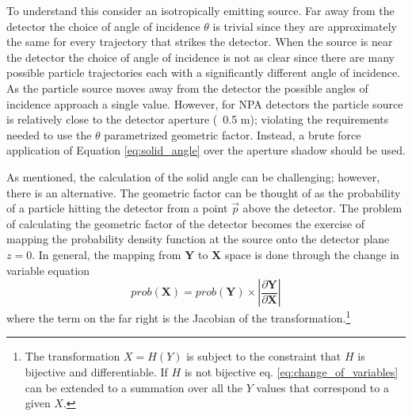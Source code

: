 To understand this consider an isotropically emitting source. Far away from the detector the choice of angle of incidence $\theta$ is trivial since they are approximately the same for every trajectory that strikes the detector. When the source is near the detector the choice of angle of incidence is not as clear since there are many possible particle trajectories each with a significantly different angle of incidence. As the particle source moves away from the detector the possible angles of incidence approach a single value. 
However, for NPA detectors the particle source is relatively close to the detector aperture (~0.5 m); violating the requirements needed to use the $\theta$ parametrized geometric factor. Instead, a brute force application of Equation \ref{eq:solid_angle} over the aperture shadow should be used.

As mentioned, the calculation of the solid angle can be challenging; however, there is an alternative.
The geometric factor can be thought of as the probability of a particle hitting the detector from a point $\vec{p}$ above the detector. The problem of calculating the geometric factor of the detector becomes the exercise of mapping the probability density function at the source onto the detector plane $z=0$. In general, the mapping from $\mathbf{Y}$ to $\mathbf{X}$ space is done through the change in variable equation 
\begin{equation}
\label{eq:change_of_variables}
prob(\mathbf{X}) = prob(\mathbf{Y}) \times \left | \frac{\partial \mathbf{Y}}{\partial \mathbf{X}} \right|
\end{equation}
where the term on the far right is the Jacobian of the transformation.\footnote{The transformation $X = H(Y)$ is subject to the constraint that $H$ is bijective and differentiable. If $H$ is not bijective eq. \ref {eq:change_of_variables} can be extended to a summation over all the $Y$ values that correspond to a given $X$.}

